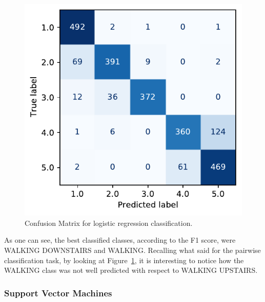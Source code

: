 \documentclass[10pt, a4paper, twocolumn]{article}
\begin{document}

\begin{figure}
    \centering
    \includegraphics[width=0.4\columnwidth]{confusion_matrix_log.pdf}
    \caption{Confusion Matrix for logistic regression classification.}
    \label{fig:log_confusion}
\end{figure}

As one can see, the best classified classes, according to the F1 score, were WALKING DOWNSTAIRS and WALKING. Recalling what said for the pairwise classification task, by looking at Figure~\ref{fig:log_confusion}, it is interesting to notice how the WALKING class was not well predicted with respect to WALKING UPSTAIRS.

\subsubsection*{Support Vector Machines}
\end{document}
